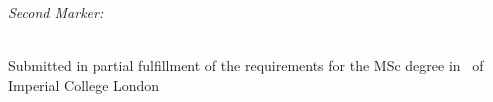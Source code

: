\begin{titlepage}
\begin{minipage}{0.4\textwidth}
\begin{flushright}
\emph{Second Marker:} \\
\secondmarker %
\end{flushright}
\end{minipage}\\[4cm]


\vfill %
Submitted in partial fulfillment of the requirements for the MSc degree in
\degreetype~of Imperial College London\\[0.5cm]

\makeatletter
\@date 
\makeatother


\end{titlepage}
